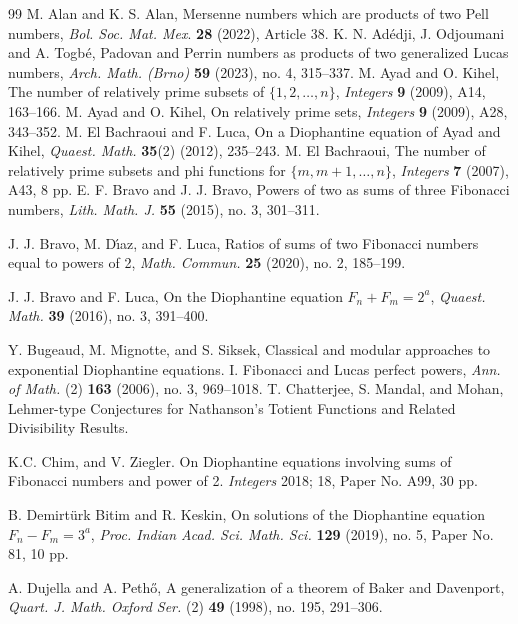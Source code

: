 \documentclass[12pt,reqno]{amsart}
\begin{document}
\begin{thebibliography}{99}
 M. Alan and K. S. Alan,
{Mersenne numbers which are products of two Pell numbers},
\emph{Bol. Soc. Mat. Mex}. \textbf{28} (2022), Article 38.
K. N. Ad{\'e}dji, J. Odjoumani and A. Togb{\'e},
{Padovan and Perrin numbers as products of two generalized Lucas numbers},
\emph{Arch. Math. (Brno)} \textbf{59} (2023), no. 4, 315--337.
M. Ayad and O. Kihel,
The number of relatively prime subsets of $\{1,2,\ldots,n\}$,
\textit{Integers} \textbf{9} (2009), A14, 163–166.
M. Ayad and O. Kihel,
On relatively prime sets,
\textit{Integers} \textbf{9} (2009), A28, 343–352.
M. El Bachraoui and F. Luca,
On a Diophantine equation of Ayad and Kihel,
\textit{Quaest. Math.} \textbf{35}(2) (2012), 235–243.
M. El Bachraoui,
The number of relatively prime subsets and phi functions for $\{m,m+1,\dots,n\}$,
\textit{Integers} \textbf{7} (2007), A43, 8 pp.
E. F. Bravo and J. J. Bravo,
{Powers of two as sums of three Fibonacci numbers},
\emph{Lith. Math. J.} \textbf{55} (2015), no. 3, 301--311.

J. J. Bravo, M. D{\'\i}az, and F. Luca,
{Ratios of sums of two Fibonacci numbers equal to powers of 2},
\emph{Math. Commun.} \textbf{25} (2020), no. 2, 185--199.

J. J. Bravo and F. Luca,
{On the Diophantine equation $F_n+F_m=2^a$},
\emph{Quaest. Math.} \textbf{39} (2016), no. 3, 391--400.

Y. Bugeaud, M. Mignotte, and S. Siksek,
{Classical and modular approaches to exponential Diophantine equations. I. Fibonacci and Lucas perfect powers},
\emph{Ann. of Math.} (2) \textbf{163} (2006), no. 3, 969--1018.
 T. Chatterjee, S. Mandal, and Mohan, Lehmer-type Conjectures for Nathanson's Totient Functions and Related Divisibility Results.

 K.C. Chim, and V. Ziegler. On Diophantine equations involving sums of Fibonacci numbers and power of 2. \emph{Integers} 2018; 18, Paper No. A99, 30 pp.




B. Demirt{\"u}rk Bitim and R. Keskin,
{On solutions of the Diophantine equation $F_n-F_m=3^a$},
\emph{Proc. Indian Acad. Sci. Math. Sci.} \textbf{129} (2019), no. 5, Paper No. 81, 10 pp.

A. Dujella and A. Peth{\H{o}},
{A generalization of a theorem of Baker and Davenport},
\emph{Quart. J. Math. Oxford Ser.} (2) \textbf{49} (1998), no. 195, 291--306.


\end{thebibliography}
\end{document}

